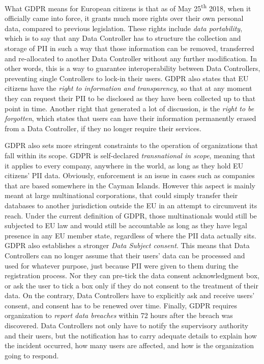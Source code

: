 What GDPR means for European citizens is that as of May 25\textsuperscript{th}
2018, when it officially came into force, it grants much more rights over their
own personal data, compared to previous legislation. These rights include
\emph{data portability}, which is to say that any Data Controller has to
structure the collection and storage of PII in such a way that those information
can be removed, transferred and re-allocated to another Data Controller without
any further modification. In other words, this is a way to guarantee
interoperability between Data Controllers, preventing single Controllers to
lock-in their users. GDPR also states that EU citizens have the \emph{right to
information and transparency}, so that at any moment they can request their PII
to be disclosed as they have been collected up to that point in time. Another
right that generated a lot of discussion, is the \emph{right to be forgotten}, which
states that users can have their information permanently erased from a Data
Controller, if they no longer require their services.

GDPR also sets more stringent constraints to the operation of organizations
that fall within its scope. GDPR is self-declared \emph{transnational in scope},
meaning that it applies to every company, anywhere in the world, as long as they hold EU
citizens' PII data. Obviously, enforcement is an issue in cases such as
companies that are based somewhere in the Cayman Islands. However this aspect is
mainly meant at large multinational corporations, that could simply
transfer their databases to another jurisdiction outside the EU in an attempt
to circumvent its reach. Under the current definition of GDPR, those
multinationals would still be subjected to EU law and would still be
accountable as long as they have legal presence in any EU member state,
regardless of where the PII data actually sits. GDPR also establishes a stronger
\emph{Data Subject consent}. This means that Data Controllers can no longer
assume that their users' data can be processed and used for whatever purpose,
just because PII were given to them during the registration process. Nor they
can pre-tick the data consent acknowledgment box, or ask the  user to tick a box
only if they do not consent to the treatment of their data. On the contrary,
Data Controllers have to explicitly ask and receive users' consent, and consent
has to be renewed over time. Finally, GDPR requires organization to \emph{report
data breaches} within 72 hours after the breach was discovered. Data Controllers
not only have to notify the supervisory authority and their users, but the
notification has to carry adequate details to explain  how the incident
occurred, how many users are affected, and how is the organization going to respond.

